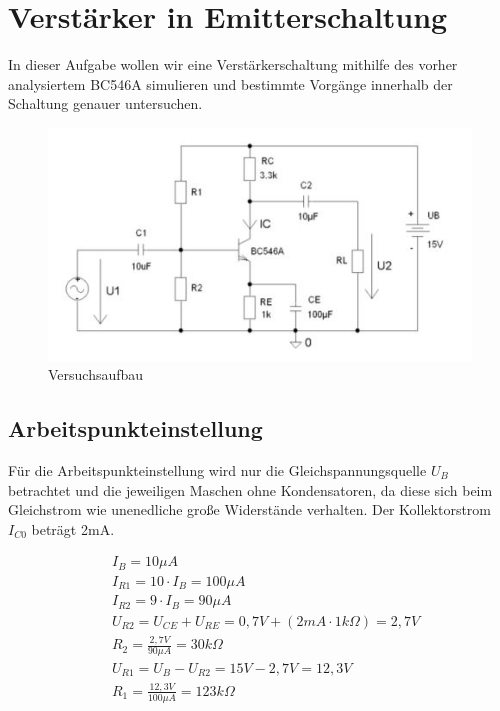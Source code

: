 \documentclass{article}
\begin{document}
\section{Verstärker in Emitterschaltung}

\begin{task}

  In dieser Aufgabe wollen wir eine Verstärkerschaltung mithilfe des vorher analysiertem BC546A simulieren und bestimmte Vorgänge innerhalb der Schaltung genauer untersuchen.

\end{task}

\begin{figure}[h]
  \centering
  \includegraphics{../assets/images/EL1P3/aufbau aufgabe2.jpg}
  \caption{Versuchsaufbau}
  \label{fig:schalt2}
\end{figure}


\subsection{Arbeitspunkteinstellung}
Für die Arbeitspunkteinstellung wird nur die Gleichspannungsquelle $U_B$ betrachtet und die jeweiligen Maschen ohne Kondensatoren, da diese sich beim Gleichstrom wie unenedliche große Widerstände verhalten.
Der Kollektorstrom $I_{C0}$ beträgt 2mA.

\begin{align*}
  &I_B = 10\mu A\\  
  &I_{R1}=10\cdot I_B = 100\mu A\\
  &I_{R2}= 9\cdot I_B = 90\mu A\\
  &U_{R2} = U_{CE} + U_{RE} = 0,7V + (2mA\cdot 1k\Omega) = 2,7V\\
  &R_{2} = \frac{2,7V}{90\mu A} = 30k\Omega\\
  &U_{R1} = U_B - U_{R2} = 15V - 2,7V = 12,3V\\
  &R_{1} = \frac{12,3V}{100\mu A}=123k\Omega
\end{align*}
\end{document}
